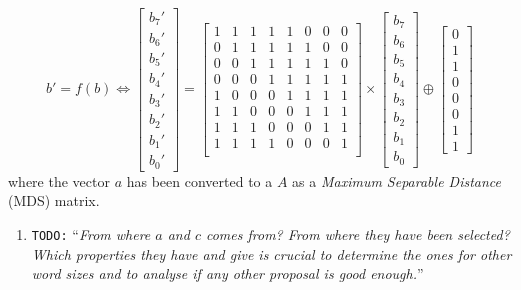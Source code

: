 \documentclass[10pt,a4paper,twoside]{llncs}
\newcommand{\todo}[1]{\texttt{\color{red}TODO:} ``\emph{#1}''}
\begin{document}
\begin{equation}\label{eq:subBytes:matrix}
 b' = f(b)\Longleftrightarrow
 \left[
  \begin{array}{c}
    b_{7}'\\b_{6}'\\b_{5}'\\b_{4}'\\b_{3}'\\b_{2}'\\b_{1}'\\b_{0}'
  \end{array}
 \right]=\left[
  \begin{array}{cccccccc}
    1&1&1&1&1&0&0&0\\
    0&1&1&1&1&1&0&0\\
    0&0&1&1&1&1&1&0\\
    0&0&0&1&1&1&1&1\\
    1&0&0&0&1&1&1&1\\
    1&1&0&0&0&1&1&1\\
    1&1&1&0&0&0&1&1\\
    1&1&1&1&0&0&0&1\\
  \end{array}
 \right]\times\left[
  \begin{array}{c}
    b_{7}\\b_{6}\\b_{5}\\b_{4}\\b_{3}\\b_{2}\\b_{1}\\b_{0}
  \end{array}
 \right]\oplus\left[
  \begin{array}{c}
    0\\1\\1\\0\\0\\0\\1\\1
  \end{array}
 \right]
\end{equation}
where the vector $a$ has been converted to a $A$ as a \emph{Maximum Separable Distance} (MDS) matrix.

\begin{enumerate}
 \item \todo{From where $a$ and $c$ comes from? From where they have been selected? Which properties they have and give is crucial to determine the ones for other word sizes and to analyse if any other proposal is good enough.}
\end{enumerate}
\end{document}
